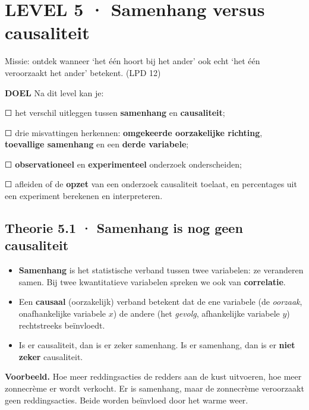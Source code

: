 \section{LEVEL 5 · Samenhang versus causaliteit}

\begin{missie}
Missie: ontdek wanneer ‘het één hoort bij het ander’ ook echt ‘het één veroorzaakt het ander’ betekent. (LPD 12)
\end{missie}

\begin{doel}
\textbf{DOEL} \quad Na dit level kan je:

☐ het verschil uitleggen tussen \textbf{samenhang} en \textbf{causaliteit};

☐ drie misvattingen herkennen: \textbf{omgekeerde oorzakelijke richting}, \textbf{toevallige samenhang} en een \textbf{derde variabele};

☐ \textbf{observationeel} en \textbf{experimenteel} onderzoek onderscheiden;

☐ afleiden of de \textbf{opzet} van een onderzoek causaliteit toelaat, en percentages uit een experiment berekenen en interpreteren.
\end{doel}

\subsection*{Theorie 5.1 · Samenhang is nog geen causaliteit}

\begin{theorie}
\begin{itemize}
\item \textbf{Samenhang} is het statistische verband tussen twee variabelen: ze veranderen samen. Bij twee kwantitatieve variabelen spreken we ook van \textbf{correlatie}.
\item Een \textbf{causaal} (oorzakelijk) verband betekent dat de ene variabele (de \emph{oorzaak}, onafhankelijke variabele $x$) de andere (het \emph{gevolg}, afhankelijke variabele $y$) rechtstreeks beïnvloedt.
\item Is er causaliteit, dan is er zeker samenhang. Is er samenhang, dan is er \textbf{niet zeker} causaliteit.
\end{itemize}
\end{theorie}

\begin{voorbeeld}
\textbf{Voorbeeld.} Hoe meer reddingsacties de redders aan de kust uitvoeren, hoe meer zonnecrème er wordt verkocht. Er is samenhang, maar de zonnecrème veroorzaakt geen reddingsacties. Beide worden beïnvloed door het warme weer.
\end{voorbeeld}

